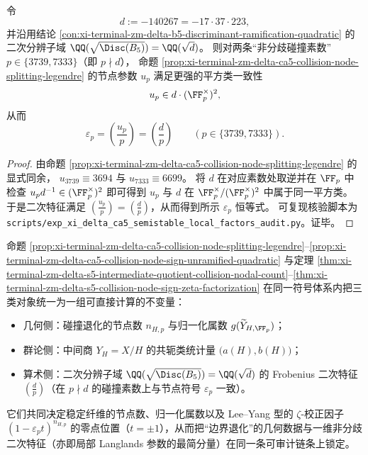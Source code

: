 \begin{proposition}[非分歧碰撞素数处的符号由二次分辨子域控制]\label{prop:xi-terminal-zm-delta-ca5-collision-node-sign-unramified-quadratic}
令
\[
d:=-140267=-17\cdot 37\cdot 223,
\]
并沿用结论 \ref{con:xi-terminal-zm-delta-b5-discriminant-ramification-quadratic} 的二次分辨子域
\(
\QQ(\sqrt{\Disc(B_5)})=\QQ(\sqrt d)
\)。
则对两条“非分歧碰撞素数” \(p\in\{3739,7333\}\)（即 \(p\nmid d\)），
命题 \ref{prop:xi-terminal-zm-delta-ca5-collision-node-splitting-legendre} 的节点参数 \(u_p\) 满足更强的平方类一致性
\[
u_p\in d\cdot(\FF_p^\times)^2,
\]
从而
\[
\varepsilon_p=\left(\frac{u_p}{p}\right)=\left(\frac{d}{p}\right)
\qquad(p\in\{3739,7333\}).
\]
\end{proposition}
\begin{proof}
由命题 \ref{prop:xi-terminal-zm-delta-ca5-collision-node-splitting-legendre} 的显式同余，
\(
u_{3739}\equiv 3694
\)
与
\(
u_{7333}\equiv 6699
\)。
将 \(d\) 在对应素数处取逆并在 \(\FF_p\) 中检查
\(
u_p d^{-1}\in(\FF_p^\times)^2
\)
即可得到 \(u_p\) 与 \(d\) 在 \(\FF_p^\times/(\FF_p^\times)^2\) 中属于同一平方类。
于是二次特征满足 \(\left(\frac{u_p}{p}\right)=\left(\frac{d}{p}\right)\)，从而得到所示 \(\varepsilon_p\) 恒等式。
可复现核验脚本为 \texttt{scripts/exp\_xi\_delta\_ca5\_semistable\_local\_factors\_audit.py}。证毕。
\end{proof}

\begin{remark}\label{rem:xi-terminal-zm-delta-collision-node-invariants-chain}
命题 \ref{prop:xi-terminal-zm-delta-ca5-collision-node-splitting-legendre}--\ref{prop:xi-terminal-zm-delta-ca5-collision-node-sign-unramified-quadratic}
与定理 \ref{thm:xi-terminal-zm-delta-s5-intermediate-quotient-collision-nodal-count}--\ref{thm:xi-terminal-zm-delta-s5-collision-node-sign-zeta-factorization}
在同一符号体系内把三类对象统一为一组可直接计算的不变量：
\begin{itemize}
  \item 几何侧：碰撞退化的节点数 \(n_{H,p}\) 与归一化属数 \(g(\widetilde Y_{H,\FF_p})\)；
  \item 群论侧：中间商 \(Y_H=X/H\) 的共轭类统计量 \(\bigl(a(H),b(H)\bigr)\)；
  \item 算术侧：二次分辨子域 \(\QQ(\sqrt{\Disc(B_5)})=\QQ(\sqrt d)\) 的 Frobenius 二次特征 \(\left(\frac{d}{p}\right)\)（在 \(p\nmid d\) 的碰撞素数上与节点符号 \(\varepsilon_p\) 一致）。
\end{itemize}
它们共同决定稳定纤维的节点数、归一化属数以及 Lee--Yang 型的 \(\zeta\)-校正因子
\(
(1-\varepsilon_p t)^{n_{H,p}}
\)
的零点位置（\(t=\pm 1\)），从而把“边界退化”的几何数据与一维非分歧二次特征（亦即局部 Langlands 参数的最简分量）在同一条可审计链条上锁定。
\end{remark}

\endinput
